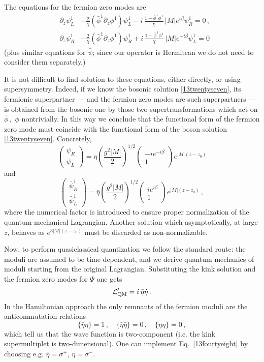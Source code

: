 \documentclass[epsfig,12pt]{article}
\def\beq{\begin{equation}}
\def\eeq{\end{equation}}
\def\beqn{\begin{eqnarray}}
\def\eeqn{\end{eqnarray}}
\def\beqn{\begin{eqnarray}}
\def\eeqn{\end{eqnarray}}
\def\beq{\begin{equation}}
\def\eeq{\end{equation}}
\begin{document}
	The equations for the fermion zero modes are
\beqn
&\partial_z\psi_L^1&    - \frac{2}{\chi}\left(\bar\phi^1\partial_z\phi^1
\right)\psi_L^1 -i\,\frac{1-\bar\phi^1\phi^1}{\chi}\, |M| e^{i\beta}\psi_R^1
=0\,,
\nonumber\\[3mm]
&\partial_z\psi_R^1&   - \frac{2}{\chi}\left(\bar\phi^1\partial_z\phi^1
\right)\psi_R^1 + i\,\frac{1-\bar\phi^1\phi^1}{\chi}\, |M| e^{- i\beta}\psi_L^1=0
\label{13fourtyfour}
\eeqn
	(plus similar equations for $\bar\psi$; since our operator is 
	Hermitean we do not need to consider them separately.)

	It is not difficult to find solution to these 
	equations, either directly, or using supersymmetry.
	Indeed, if we know the bosonic solution \eqref{13twentyseven},
	its fermionic superpartner --- and the fermion zero modes are such 
	 superpartners --- is obtained from the
	bosonic one by those two supertransformations which act on
	$\bar\phi\,,\,\,\phi$ nontrivially.
	In this way we conclude that the
	  functional form of the fermion zero mode 
	must coincide  with the functional form of the boson  
	  solution \eqref{13twentyseven}. 
	Concretely,
\beq
\left(\begin{array}{c}
\psi_R\\  \psi_L
\end{array}
\right)=\eta 
\left(\frac{g^2|M|}{2}\right)^{1/2}
\left(\begin{array}{c}
-ie^{-i\beta}\\   1
\end{array}
\right)e^{|M|(z-z_0)}
\label{13fourtyfive}
\eeq
	and
 \beq
\left(\begin{array}{c}
\bar \psi_R^1\\  \bar \psi_L^1
\end{array}
\right)=\bar\eta \left(\frac{g^2|M|}{2}\right)^{1/2} \left(\begin{array}{c}
ie^{ i\beta}\\   1
\end{array}
\right)e^{|M|(z-z_0)}\,,
\label{13fourtysix}
\eeq
	where the numerical factor is introduced to ensure proper
	normalization of the quantum-mechanical Lagrangian.
	Another solution which asymptotically, at large $z$, behaves
	as $e^{3|M|(z-z_0)}$ must be discarded as non-normalizable.

	Now, to
	perform   quasiclassical quantization we follow the standard route:
	the moduli are assumed to be   time-dependent, and we derive 
	quantum mechanics of moduli starting from the original Lagrangian.
	Substituting the kink solution and the fermion zero modes for
	$\Psi$ one gets
\beq
{\cal L}'_{\rm QM} = i\, \bar\eta\dot\eta\,.
\label{13fourtyseven}
\eeq
	In the Hamiltonian approach the only remnants of the fermion moduli
	are the anticommutation relations
\beq
\{\bar\eta\eta\} =1\,,\quad \{\bar\eta \bar\eta\} =0\,,\quad \{\eta \eta\} =0\,,
\label{13fourtyeight}
\eeq
	which tell us that the wave function is two-component
	(i.e. the kink supermultiplet is two-dimensional). One can implement
	Eq.~\eqref{13fourtyeight} by choosing e.g. 
	$\bar\eta=\sigma^+$, $ \eta=\sigma^-$.
\end{document}
